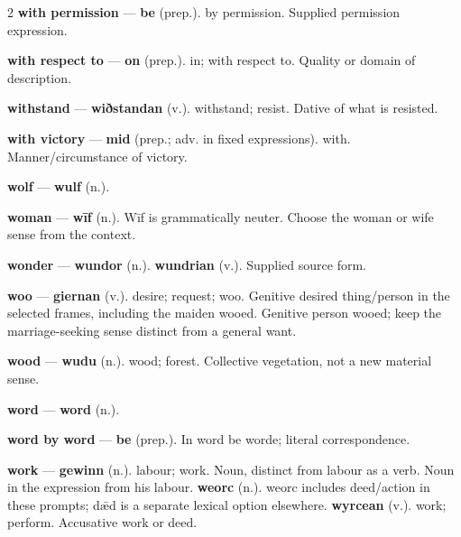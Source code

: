 \begin{multicols}{2}
\textbf{with permission} — \textbf{be} (prep.). by permission. Supplied permission expression.\par
\textbf{with respect to} — \textbf{on} (prep.). in; with respect to. Quality or domain of description.\par
\textbf{withstand} — \textbf{wiðstandan} (v.). withstand; resist. Dative of what is resisted.\par
\textbf{with victory} — \textbf{mid} (prep.; adv. in fixed expressions). with. Manner/circumstance of victory.\par
\textbf{wolf} — \textbf{wulf} (n.).\par
\textbf{woman} — \textbf{wīf} (n.). Wīf is grammatically neuter. Choose the woman or wife sense from the context.\par
\textbf{wonder} — \textbf{wundor} (n.).  \textbf{wundrian} (v.). Supplied source form.\par
\textbf{woo} — \textbf{giernan} (v.). desire; request; woo. Genitive desired thing/person in the selected frames, including the maiden wooed. Genitive person wooed; keep the marriage-seeking sense distinct from a general want.\par
\textbf{wood} — \textbf{wudu} (n.). wood; forest. Collective vegetation, not a new material sense.\par
\textbf{word} — \textbf{word} (n.).\par
\textbf{word by word} — \textbf{be} (prep.). In word be worde; literal correspondence.\par
\textbf{work} — \textbf{gewinn} (n.). labour; work. Noun, distinct from labour as a verb. Noun in the expression from his labour. \textbf{weorc} (n.). weorc includes deed/action in these prompts; dǣd is a separate lexical option elsewhere. \textbf{wyrcean} (v.). work; perform. Accusative work or deed.\par

\end{multicols}
